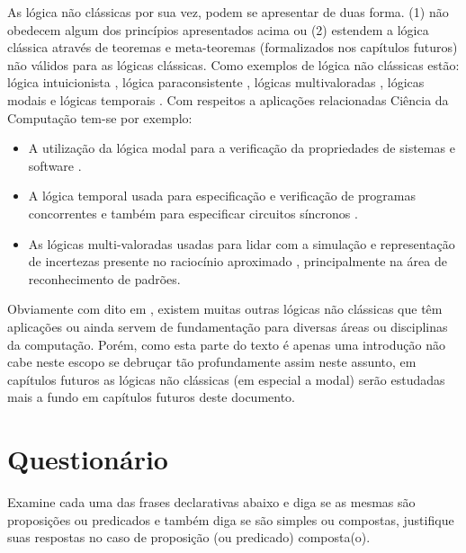 As lógica não clássicas por sua vez, podem se apresentar de duas forma. (1) não obedecem algum dos princípios apresentados acima ou (2) estendem a lógica clássica através de teoremas e meta-teoremas (formalizados nos capítulos futuros) não válidos para as lógicas clássicas. Como exemplos de lógica não clássicas estão: lógica intuicionista \cite{lungarzo1972}, lógica paraconsistente \cite{da2008logica}, lógicas multivaloradas \cite{benja-Logica, magnus2020}, lógicas modais \cite{magnus2020} e lógicas temporais \cite{halpern1983, harel1979, manna1979}. Com respeitos a aplicações relacionadas Ciência da Computação tem-se por exemplo:

\begin{itemize}
	\item A utilização da lógica modal para a verificação da propriedades de sistemas e software \cite{harel1979}.
	\item A lógica temporal usada para especificação e verificação de programas
concorrentes \cite{manna1979} e também para especificar circuitos síncronos \cite{halpern1983}.
	\item As lógicas multi-valoradas usadas para lidar com a simulação e representação de
incertezas presente no raciocínio aproximado \cite{benja-Logica}, principalmente na área de reconhecimento de padrões.
\end{itemize}

Obviamente com dito em \cite{benja-Logica}, existem muitas outras lógicas não clássicas que têm aplicações ou ainda servem de fundamentação para diversas áreas ou disciplinas da computação. Porém, como esta parte do texto é apenas uma introdução não cabe neste escopo se debruçar tão profundamente assim neste assunto, em capítulos futuros as lógicas não clássicas (em especial a modal) serão estudadas mais a fundo em capítulos futuros deste documento.

\section{Questionário}\label{sec:Questionario1part3}

\begin{questao}
	Examine cada uma das frases declarativas abaixo e diga se as mesmas são proposições ou predicados e também diga se são simples ou compostas, justifique suas respostas no caso de proposição (ou predicado) composta(o). 
\end{questao}

